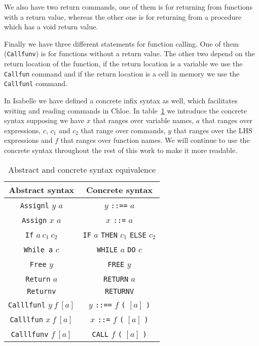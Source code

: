 We also have two return commands, one of them is for returning from functions with a return value, whereas the other one is for returning from a procedure which has a void return value.

Finally we have three different statements for function calling.
One of them (\verb|Callfunv|) is for functions without a return value.
The other two depend on the return location of the function, if the return location is a variable we use the \verb|Callfun| command and if the return location is a cell in memory we use the \verb|Callfunl| command.

In Isabelle we have defined a concrete infix syntax as well, which facilitates writing and reading commands in Chloe.
In table~\ref{tab:concrete_syntax} we introduce the concrete syntax supposing we have $x$ that ranges over variable names, $a$ that ranges over expressions, $c$, $c_{1}$ and $c_{2}$ that range over commands, $y$ that ranges over the LHS expressions and $f$ that ranges over function names.
We will continue to use the concrete syntax throughout the rest of this work to make it more readable.

\begin{table}[h!]
\centering
\begin{tabular}{|c|c|}
  \hline
  \textbf{Abstract syntax} & \textbf{Concrete syntax} \\ [0.5ex]
  \hline \hline
  \verb|Assignl| $y$ $a$ & $y$ \verb|::==| $a$ \\
  \verb|Assign| $x$ $a$ & $x$ \verb|::=| $a$ \\
  \verb|If| $a\ c_{1}\ c_{2}$ & \verb|IF| $a$ \verb|THEN| $c_{1}$ \verb|ELSE| $c_{2}$ \\
  \verb|While a| $c$ & \verb|WHILE| $a$ \verb|DO| $c$ \\
  \verb|Free| $y$ & \verb|FREE| $y$ \\
  \verb|Return| $a$ & \verb|RETURN| $a$ \\
  \verb|Returnv| & \verb|RETURNV| \\
  \verb|Calllfunl| $y\ f\ [a]$ & $y$ \verb|::==| $f$ \verb|(| $[a]$ \verb|)| \\
  \verb|Calllfun| $x\ f\ [a]$ & $x$ \verb|::=| $f$ \verb|(| $[a]$ \verb|)| \\
  \verb|Calllfunv| $f\ [a]$ & \verb|CALL| $f$ \verb|(| $[a]$ \verb|)| \\
  \hline
\end{tabular}

\caption{Abstract and concrete syntax equivalence}
\label{tab:concrete_syntax}
\end{table}


